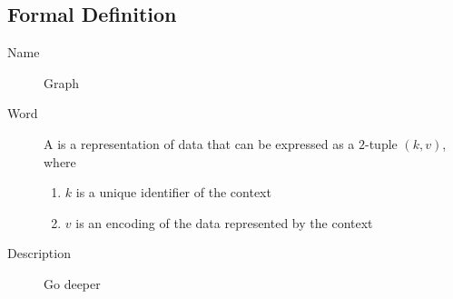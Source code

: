 
\subsection{Formal Definition}

\begin{description}
    \item[Name] Graph \vspace{2mm}
    \item[Word] \begin{definition}[action]
              A \textbf{} is a representation of data that can be expressed as a $2$-tuple $(k,v)$, where
              \begin{enumerate}
                  \item $k$ is a unique identifier of the context
                  \item $v$ is an encoding of the data represented by the context
              \end{enumerate}
          \end{definition}
    \item[Description] Go deeper
\end{description}
